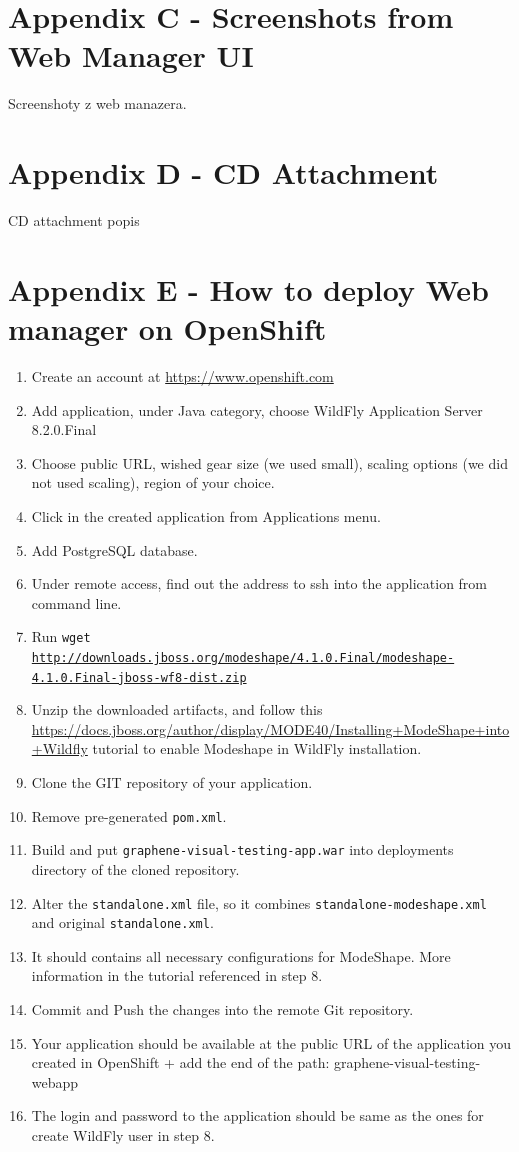 \documentclass[11pt,oneside,final]{fithesis2}
\begin{document}
\chapter{Appendix C - Screenshots from Web Manager UI}
\label{appendix:c}
Screenshoty z web manazera.

\chapter{Appendix D - CD Attachment}
\label{appendix:d}
CD attachment popis

\chapter{Appendix E - How to deploy Web manager on OpenShift}
\label{appendix:e}
\begin{enumerate}
 \item Create an account at \url{https://www.openshift.com}
 \item Add application, under Java category, choose WildFly Application Server 8.2.0.Final
 \item Choose public URL, wished gear size (we used small), scaling options (we did not used scaling), region of your choice.
 \item Click in the created application from Applications menu.
 \item Add PostgreSQL database.
 \item Under remote access, find out the address to ssh into the application from command line.
 \item Run \texttt{wget \url{http://downloads.jboss.org/modeshape/4.1.0.Final/modeshape-4.1.0.Final-jboss-wf8-dist.zip}}
 \item Unzip the downloaded artifacts, and follow this 
    \url{https://docs.jboss.org/author/display/MODE40/Installing+ModeShape+into+Wildfly} tutorial to 
    enable Modeshape in WildFly installation.
 \item Clone the GIT repository of your application.
 \item Remove pre-generated \texttt{pom.xml}.
 \item Build and put \texttt{graphene-visual-testing-app.war} into deployments directory of the cloned repository.
 \item Alter the \texttt{standalone.xml} file, so it combines \texttt{standalone-modeshape.xml} and original \texttt{standalone.xml}.
 \item It should contains all necessary configurations for ModeShape. More information in the tutorial referenced in step 8.
 \item Commit and Push the changes into the remote Git repository.
 \item Your application should be available at the public URL of the application you created in OpenShift + add the end of the path:
 graphene-visual-testing-webapp
 \item The login and password to the application should be same as the ones for create WildFly user in step 8.
\end{enumerate}
\end{document}
